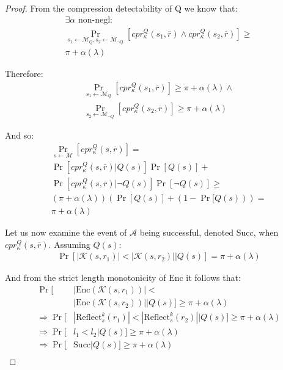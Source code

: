 \begin{proof}
From the compression detectability of Q we know that:
\begin{align*}
    \exists \alpha \text{ non-negl}:\\
    \Pr_{s_1 \leftarrow \mathcal{M}_Q,
         s_2 \leftarrow \mathcal{M}_{\lnot Q}}
         [cpr^Q_{\kappa}(s_1, \overbar{r}) \land
          cpr^Q_{\kappa}(s_2, \overbar{r})]
    \geq\\
    \pi + \alpha(\lambda)
\end{align*}

Therefore:
\begin{align*}
    \Pr_{s_1 \leftarrow \mathcal{M}_Q}
         [cpr^Q_{\kappa}(s_1, \overbar{r})]
    \geq
    \pi + \alpha(\lambda) \land\\
    \Pr_{s_2 \leftarrow \mathcal{M}_{\lnot Q}}
         [cpr^Q_{\kappa}(s_2, \overbar{r})]
    \geq
    \pi + \alpha(\lambda)
\end{align*}

And so:
\begin{align*}
    \Pr_{s \leftarrow \mathcal{M}}
         [cpr^Q_{\kappa}(s, \overbar{r})]
    =\\
    \Pr[cpr^Q_{\kappa}(s, \overbar{r})|Q(s)]\Pr[Q(s)]
    +\\
    \Pr[cpr^Q_{\kappa}(s, \overbar{r})|\lnot Q(s)]\Pr[\lnot Q(s)]
    \geq\\
    (\pi + \alpha(\lambda))(\Pr[Q(s)] + (1 - \Pr[Q(s)))
    =\\
    \pi + \alpha(\lambda)
\end{align*}

Let us now examine the event of $\mathcal{A}$ being successful, denoted Succ,
when $cpr^Q_{\kappa}(s, \overbar{r})$. Assuming $Q(s)$:
\begin{align*}
    \Pr[|\mathcal{K}(s, r_1)| < |\mathcal{K}(s, r_2)||Q(s)]
    = \pi + \alpha(\lambda)
\end{align*}

And from the strict length monotonicity of $\textrm{Enc}$ it follows that:
\begin{align*}
    \Pr[&|\textrm{Enc}(\mathcal{K}(s, r_1))| <\\&|\textrm{Enc}(\mathcal{K}(s, r_2))||Q(s)]
        \geq \pi + \alpha(\lambda)\\
    \Rightarrow \Pr[&
        |\text{Reflect}^{k}_s(r_1)|
        <
        |\text{Reflect}^{k}_s(r_2)||Q(s)
    ]
        \geq \pi + \alpha(\lambda)\\
    \Rightarrow \Pr[&l_1 < l_2|Q(s)]
        \geq \pi + \alpha(\lambda)\\
    \Rightarrow \Pr[&\text{Succ}|Q(s)]
        \geq \pi + \alpha(\lambda)\\
\end{align*}


\end{proof}
